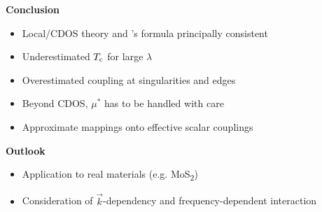 \documentclass[10pt]{beamer}
\def\cmark{\ding{51}}
\def\xmark{\ding{55}}
\begin{document}
    \begin{frame}[label=conclusion]
        \begin{center}
            \color{titleblue} \bf \Large
            Conclusion
        \end{center}

        \begin{itemize}
            \item[\cmark] Local/CDOS  theory and
                          's formula principally consistent
            \medskip
            \item[\xmark] Underestimated $T \sb{\text{c}}$ for large $\lambda$
            \item[\xmark] Overestimated coupling at 
                          singularities and edges
            \item[\xmark] Beyond CDOS, $\mu^*$ has to be handled with care
            \medskip
            \item[\cmark] Approximate mappings onto effective scalar couplings
        \end{itemize}

        \medskip

        \begin{center}
            \color{titleblue} \bf \Large
            Outlook
        \end{center}

        \begin{itemize}
            \item Application to real materials (e.g. MoS\textsubscript2)
            \item Consideration of $\vec k$-dependency and frequency-dependent
                   interaction
        \end{itemize}
    \end{frame}
\end{document}
